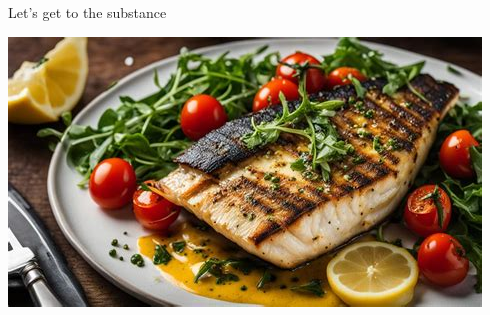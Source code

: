 \documentclass[aspectratio=169]{beamer}
\begin{document}
\begin{frame}{Let's get to the substance}


  \centering\includegraphics[width = 0.8\linewidth]{figures/cooked-sea-bass.jpg}
\end{frame}
\end{document}
